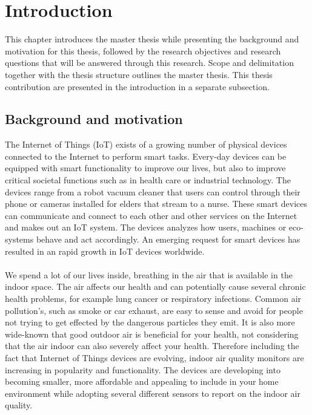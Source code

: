 \chapter*{Introduction}
This chapter introduces the master thesis while presenting the background and motivation for this thesis, followed by the research objectives and research questions that will be answered through this research. Scope and delimitation together with the thesis structure outlines the master thesis. This thesis contribution are presented in the introduction in a separate subsection. 
\section*{Background and motivation}
The Internet of Things (IoT) exists of a growing number of physical devices connected to the Internet to perform smart tasks. \cite{IoTSurveyAl-Fuqaha} Every-day devices can be equipped with smart functionality to improve our lives, but also to improve critical societal functions such as in health care or industrial technology. The devices range from a robot vacuum cleaner that users can control through their phone or cameras installed for elders that stream to a nurse. These smart devices can communicate and connect to each other and other services on the Internet and makes out an IoT system. The devices analyzes how users, machines or eco-systems behave and act accordingly. An emerging request for smart devices has resulted in an rapid growth in IoT devices worldwide. \cite{IoTAndPrivacy}
\\\\
We spend a lot of our lives inside, breathing in the air that is available in the indoor space. \cite{IndoorAirQualityMonitorIoT} The air affects our health and can potentially cause several chronic health problems, for example lung cancer or respiratory infections. \cite{IAQMonitorReview} Common air pollution's, such as smoke or car exhaust,  are easy to sense and avoid for people not trying to get effected by the dangerous particles they emit. It is also more wide-known that good outdoor air is beneficial for your health, not considering that the air indoor can also severely affect your health. \cite{IndoorAirQuality} Therefore including the fact that Internet of Things devices are evolving, indoor air quality monitors are increasing in popularity and functionality. \cite{SecurityAndDataIntInAQM} The devices are developing into becoming smaller, more affordable and appealing to include in your home environment while adopting several different sensors to report on the indoor air quality. 

